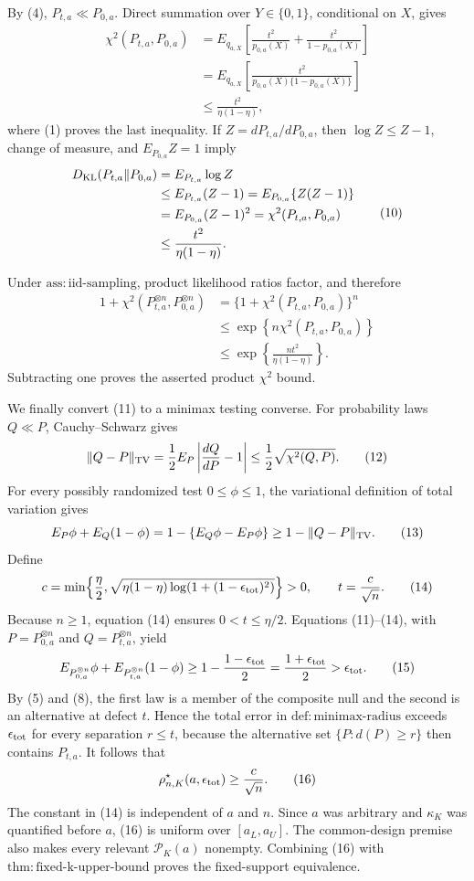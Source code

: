 By (4), \(P_{t,a}\ll P_{0,a}\).  Direct summation over \(Y\in\{0,1\}\), conditional on \(X\), gives
\[
\begin{aligned}
\chi^2(P_{t,a},P_{0,a})
&=E_{q_{a,X}}\!\left[
  \frac{t^2}{p_{0,a}(X)}+
  \frac{t^2}{1-p_{0,a}(X)}\right]\\
&=E_{q_{a,X}}\!\left[
  \frac{t^2}{p_{0,a}(X)\{1-p_{0,a}(X)\}}\right]\\
&\le\frac{t^2}{\eta(1-\eta)},
\end{aligned} \tag{9}
\]
where (1) proves the last inequality.  If \(Z=dP_{t,a}/dP_{0,a}\), then \(\log Z\le Z-1\), change of measure, and \(E_{P_{0,a}}Z=1\) imply
\[
\begin{aligned}
D_{\rm KL}(P_{t,a}\|P_{0,a})
&=E_{P_{t,a}}\log Z\\
&\le E_{P_{t,a}}(Z-1)
=E_{P_{0,a}}\{Z(Z-1)\}\\
&=E_{P_{0,a}}(Z-1)^2
=\chi^2(P_{t,a},P_{0,a})\\
&\le\frac{t^2}{\eta(1-\eta)}. 
\end{aligned} \tag{10}
\]

Under \(\mathrm{ass:iid\mbox{-}sampling}\), product likelihood ratios factor, and therefore
\[
\begin{aligned}
1+\chi^2(P_{t,a}^{\otimes n},P_{0,a}^{\otimes n})
&=\{1+\chi^2(P_{t,a},P_{0,a})\}^n\\
&\le\exp\!\left\{n\chi^2(P_{t,a},P_{0,a})\right\}\\
&\le\exp\!\left\{\frac{nt^2}{\eta(1-\eta)}\right\}.
\end{aligned} \tag{11}
\]
Subtracting one proves the asserted product \(\chi^2\) bound.

We finally convert (11) to a minimax testing converse.  For probability laws \(Q\ll P\), Cauchy--Schwarz gives
\[
\|Q-P\|_{\rm TV}
=\frac12E_P\left|\frac{dQ}{dP}-1\right|
\le\frac12\sqrt{\chi^2(Q,P)}. \tag{12}
\]
For every possibly randomized test \(0\le\phi\le1\), the variational definition of total variation gives
\[
E_P\phi+E_Q(1-\phi)
=1-\{E_Q\phi-E_P\phi\}
\ge1-\|Q-P\|_{\rm TV}. \tag{13}
\]
Define
\[
c=\min\!\left\{\frac\eta2,
\sqrt{\eta(1-\eta)\log\!\left(1+(1-\epsilon_{\rm tot})^2\right)}\right\}>0,
\qquad t=\frac{c}{\sqrt n}. \tag{14}
\]
Because \(n\ge1\), equation (14) ensures \(0<t\le\eta/2\).  Equations (11)--(14), with \(P=P_{0,a}^{\otimes n}\) and \(Q=P_{t,a}^{\otimes n}\), yield
\[
E_{P_{0,a}^{\otimes n}}\phi+E_{P_{t,a}^{\otimes n}}(1-\phi)
\ge1-\frac{1-\epsilon_{\rm tot}}2
=\frac{1+\epsilon_{\rm tot}}2
>\epsilon_{\rm tot}. \tag{15}
\]
By (5) and (8), the first law is a member of the composite null and the second is an alternative at defect \(t\).  Hence the total error in \(\mathrm{def:minimax\mbox{-}radius}\) exceeds \(\epsilon_{\rm tot}\) for every separation \(r\le t\), because the alternative set \(\{P:d(P)\ge r\}\) then contains \(P_{t,a}\).  It follows that
\[
\rho^\star_{n,K}(a,\epsilon_{\rm tot})\ge\frac{c}{\sqrt n}. \tag{16}
\]
The constant in (14) is independent of \(a\) and \(n\).  Since \(a\) was arbitrary and \(\kappa_K\) was quantified before \(a\), (16) is uniform over \([a_L,a_U]\).  The common-design premise also makes every relevant \(\mathcal P_K(a)\) nonempty.  Combining (16) with \(\mathrm{thm:fixed\mbox{-}k\mbox{-}upper\mbox{-}bound}\) proves the fixed-support equivalence.
